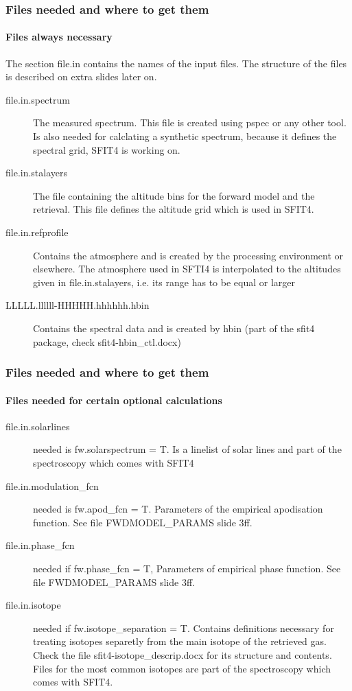 \documentclass[notes=hide]{beamer}
\begin{document}
\begin{frame}
  \frametitle{Files needed and where to get them}
  \framesubtitle{Files always necessary}
  The section file.in
  contains the names of the input files. The structure of the files is
  described on extra slides later on.
  \begin{description}
  \item[file.in.spectrum] The measured spectrum. This file is created
    using pspec or any other tool. Is also needed for calclating a
    synthetic spectrum, because it defines the spectral grid, SFIT4 is
    working on.
  \item[file.in.stalayers] The file containing the altitude bins for
    the forward model and the retrieval. This file defines the
    altitude grid which is used in SFIT4.
  \item[file.in.refprofile] Contains the atmosphere and is created by
    the processing environment or elsewhere. The atmosphere used in
    SFTI4 is interpolated to the altitudes given in file.in.stalayers,
    i.e. its range has to be equal or larger
  \item[LLLLL.llllll-HHHHH.hhhhhh.hbin] Contains the spectral data and
    is created by hbin (part of the sfit4 package, check sfit4-hbin\_ctl.docx)
  \end{description}
\end{frame}

\begin{frame}
  \frametitle{Files needed and where to get them}
  \framesubtitle{Files needed for certain optional calculations}
  \begin{description}
  \item[file.in.solarlines] needed is fw.solarspectrum = T. Is a
    linelist of solar lines and part of the spectroscopy which comes
    with SFIT4
  \item[file.in.modulation\_fcn] needed is fw.apod\_fcn =
    T. Parameters of the empirical apodisation function. See file
    FWDMODEL\_PARAMS slide 3ff.
  \item[file.in.phase\_fcn] needed if fw.phase\_fcn = T, Parameters of
    empirical phase function. See file
    FWDMODEL\_PARAMS slide 3ff. 
  \item[file.in.isotope] needed if fw.isotope\_separation =
    T. Contains definitions necessary for treating isotopes separetly
    from the main isotope of the retrieved gas. Check the file
    sfit4-isotope\_descrip.docx for its structure and
    contents. Files for the most common isotopes are part of the
    spectroscopy which comes with SFIT4.
  \end{description}
\end{frame}
\end{document}

